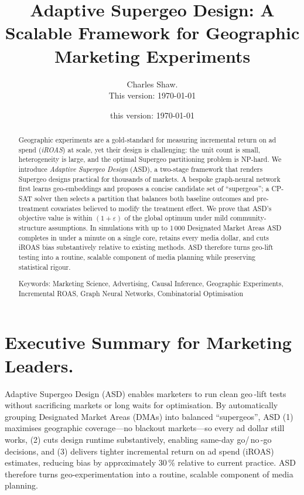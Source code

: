 \documentclass[final,3p,fleqn, 10pt]{elsarticle}
\begin{document}
\begin{frontmatter}
\title{Adaptive Supergeo Design: A Scalable Framework for Geographic Marketing Experiments}
\author{Charles Shaw. \\This version: \today}
\date{this version: \today}

  \begin{abstract}
Geographic experiments are a gold-standard for measuring incremental return on ad spend (\textit{iROAS}) at scale, yet their design is challenging: the unit count is small, heterogeneity is large, and the optimal Supergeo partitioning problem is NP-hard. We introduce \emph{Adaptive Supergeo Design} (ASD), a two-stage framework that renders Supergeo designs practical for thousands of markets. A bespoke graph-neural network first learns geo-embeddings and proposes a concise candidate set of “supergeos”; a CP-SAT solver then selects a partition that balances both baseline outcomes and pre-treatment covariates believed to modify the treatment effect. We prove that ASD’s objective value is within $(1+\varepsilon)$ of the global optimum under mild community-structure assumptions. In simulations with up to 1\,000 Designated Market Areas ASD completes in under a minute on a single core, retains every media dollar, and cuts iROAS bias substantively relative to existing methods. ASD therefore turns geo-lift testing into a routine, scalable component of media planning while preserving statistical rigour.
\vspace{10pt}

Keywords: Marketing Science, Advertising, Causal Inference, Geographic Experiments, Incremental ROAS, Graph Neural Networks, Combinatorial Optimisation
\end{abstract}



\end{frontmatter}


\section*{Executive Summary for Marketing Leaders.} Adaptive Supergeo Design (ASD) enables marketers to run clean geo\,-lift tests without sacrificing markets or long waits for optimisation. By automatically grouping Designated Market Areas (DMAs) into balanced ``supergeos'', ASD (1) maximises geographic coverage—no blackout markets—so every ad dollar still works, (2) cuts design runtime substantively, enabling same-day go/\,no\,-go decisions, and (3) delivers tighter incremental return on ad spend (iROAS) estimates, reducing bias by approximately 30\,\% relative to current practice. ASD therefore turns geo-experimentation into a routine, scalable component of media planning.
\end{document}
